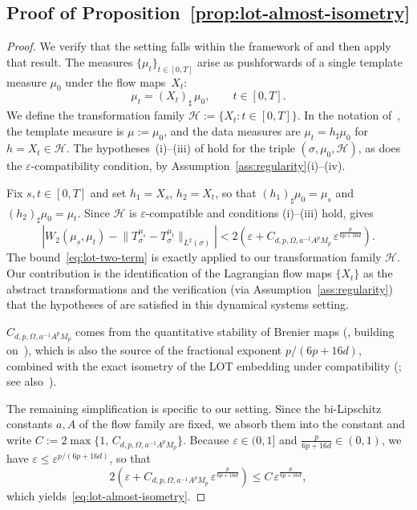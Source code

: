 \documentclass[11pt]{article}
\newcommand{\1}{\mathbf{1}}
\begin{document}
\subsection{Proof of Proposition~\ref{prop:lot-almost-isometry}}
\label{app:proof-lot-almost-isometry}
\begin{proof}
We verify that the setting falls within the framework of
\cite[Theorem~A.4]{cloninger2023lotwassmap} and then apply that result.
The measures $\{\mu_t\}_{t\in[0,T]}$ arise as pushforwards of a single
template measure $\mu_0$ under the flow maps~$X_t$:
\[
  \mu_t = (X_t)_\sharp\,\mu_0, \qquad t\in[0,T].
\]
We define the transformation family
$\mathcal{H}:=\{X_t : t\in[0,T]\}$. In the notation
of~\cite{cloninger2023lotwassmap}, the template measure is
$\mu:=\mu_0$, and the data measures are
$\mu_t = h_\sharp\mu_0$ for $h = X_t\in\mathcal{H}$. The
hypotheses~(i)--(iii) of
\cite[Theorem~A.4]{cloninger2023lotwassmap} hold for the triple
$(\sigma,\mu_0,\mathcal{H})$, as does the
$\varepsilon$-compatibility condition, by
Assumption~\ref{ass:regularity}(i)--(iv).

Fix $s,t\in[0,T]$ and set $h_1 = X_s$, $h_2 = X_t$, so that
$(h_1)_\sharp\mu_0 = \mu_s$ and $(h_2)_\sharp\mu_0 = \mu_t$.
Since $\mathcal{H}$ is $\varepsilon$-compatible and conditions
(i)--(iii) hold, \cite[Theorem~A.4]{cloninger2023lotwassmap}
gives
\begin{equation}\label{eq:lot-two-term}
  \left| W_2(\mu_s,\mu_t)
       - \bigl\|T_\sigma^{\mu_s}
           - T_\sigma^{\mu_t}\bigr\|_{L^2(\sigma)} \right|
  < 2\!\left(\varepsilon
       + C_{d,p,\Omega,a^{-1}\!A^p M_p}\,
         \varepsilon^{\frac{p}{6p+16d}}\right).
\end{equation}
The bound~\eqref{eq:lot-two-term} is exactly
\cite[Theorem~A.4]{cloninger2023lotwassmap} applied to our
transformation family $\mathcal{H}$. Our contribution is the
identification of the Lagrangian flow maps $\{X_t\}$ as the
abstract transformations and the verification (via
Assumption~\ref{ass:regularity}) that the hypotheses of
\cite{cloninger2023lotwassmap} are satisfied in this dynamical
systems setting. 

$C_{d,p,\Omega,a^{-1}\!A^p M_p}$ comes from the quantitative stability of Brenier maps (\cite[Lemma~A.2]{cloninger2023lotwassmap}, building
on~\cite[Corollary~4.4]{merigot2021}), which is also
the source of the fractional exponent $p/(6p+16d)$,
combined with the exact isometry of the LOT embedding
under compatibility
(\cite[Lemma~A.3]{cloninger2023lotwassmap}; see
also~\cite{moosmuller2020linear,khurana2022supervised}).

The remaining simplification is specific to our setting.
Since the bi-Lipschitz constants $a,A$ of the flow family are
fixed, we absorb them into the constant and write
$C := 2\max\!\bigl\{1,\,C_{d,p,\Omega,a^{-1}\!A^p M_p}\bigr\}$.
Because $\varepsilon\in(0,1]$ and
$\frac{p}{6p+16d}\in(0,1)$, we have
$\varepsilon \le \varepsilon^{p/(6p+16d)}$, so that
\[
  2\!\left(\varepsilon
     + C_{d,p,\Omega,a^{-1}\!A^p M_p}\,
       \varepsilon^{\frac{p}{6p+16d}}\right)
  \le C\,\varepsilon^{\frac{p}{6p+16d}},
\]
which yields~\eqref{eq:lot-almost-isometry}.
\end{proof}
\end{document}
